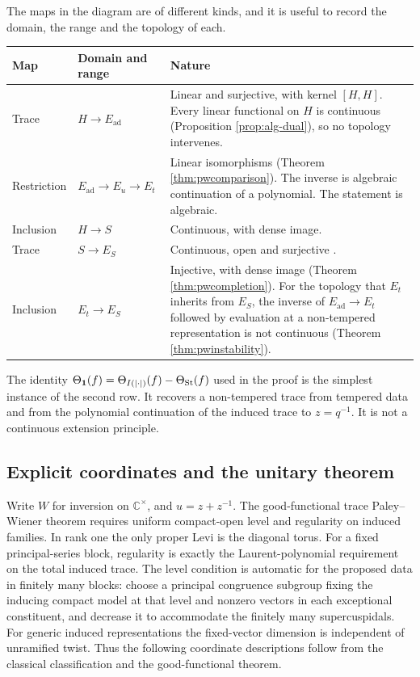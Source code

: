 The maps in the diagram are of different kinds, and it is useful to record the domain, the range and the topology of each.
\begin{center}\small
\begin{tabularx}{\linewidth}{@{}p{.2\linewidth}p{.2\linewidth}X@{}}\toprule
Map & Domain and range & Nature\\\midrule
Trace & $H\to E_{\mathrm{ad}}$ & Linear and surjective, with kernel $[H,H]$. Every linear functional on $H$ is continuous (Proposition \ref{prop:alg-dual}), so no topology intervenes.\\
Restriction & $E_{\mathrm{ad}}\to E_u\to E_t$ & Linear isomorphisms (Theorem \ref{thm:pwcomparison}). The inverse is algebraic continuation of a polynomial. The statement is algebraic.\\
Inclusion & $H\to S$ & Continuous, with dense image.\\
Trace & $S\to E_S$ & Continuous, open and surjective \cite{Ar94}.\\
Inclusion & $E_t\to E_S$ & Injective, with dense image (Theorem \ref{thm:pwcompletion}). For the topology that $E_t$ inherits from $E_S$, the inverse of $E_{\mathrm{ad}}\to E_t$ followed by evaluation at a non-tempered representation is not continuous (Theorem \ref{thm:pwinstability}).\\\bottomrule
\end{tabularx}
\end{center}
The identity $\Theta_{\mathbf 1}(f)=\Theta_{I(|\cdot|)}(f)-\Theta_{\operatorname{St}}(f)$ used in the proof is the simplest instance of the second row. It recovers a non-tempered trace from tempered data and from the polynomial continuation of the induced trace to $z=q^{-1}$. It is not a continuous extension principle.

\subsection{Explicit coordinates and the unitary theorem}
Write $W$ for inversion on $\mathbb C^\times$, and $u=z+z^{-1}$. The good-functional trace Paley--Wiener theorem \cite{BDK86} requires uniform compact-open level and regularity on induced families. In rank one the only proper Levi is the diagonal torus. For a fixed principal-series block, regularity is exactly the Laurent-polynomial requirement on the total induced trace. The level condition is automatic for the proposed data in finitely many blocks: choose a principal congruence subgroup fixing the inducing compact model at that level and nonzero vectors in each exceptional constituent, and decrease it to accommodate the finitely many supercuspidals. For generic induced representations the fixed-vector dimension is independent of unramified twist. Thus the following coordinate descriptions follow from the classical classification and the good-functional theorem.

